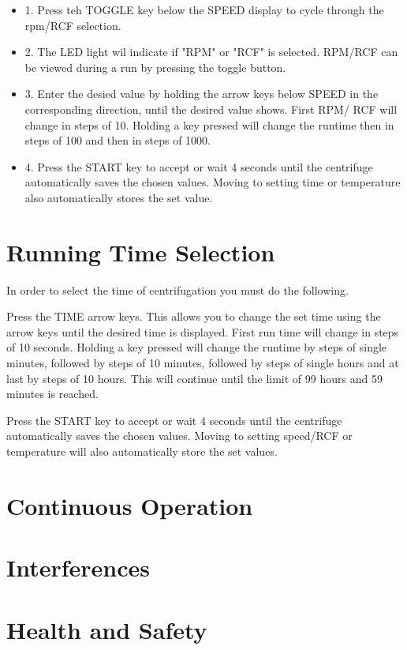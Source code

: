 \documentclass[12pt]{../SOP3_beta}
\begin{document}
\begin{itemize}
  \item 1. Press teh TOGGLE key below the SPEED display to cycle through the rpm/RCF selection.
  \item 2. The LED light wil indicate if "RPM" or "RCF" is selected. RPM/RCF can be viewed during a run by pressing the toggle button. 
  \item 3. Enter the desied value by holding the arrow keys below SPEED in the corresponding direction, until the desired value shows. First RPM/ RCF will change in steps of 10. Holding a key pressed will change the runtime then in steps of 100 and then in steps of 1000. 
  \item 4. Press the START key to accept or wait 4 seconds until the centrifuge automatically saves the chosen values. Moving to setting time or temperature also automatically stores the set value. 
\end{itemize}

\section{Running Time Selection}

\NP In order to select the time of centrifugation you must do the following.

\NP Press the TIME arrow keys. This allows you to change the set time using the arrow keys until the desired time is displayed. First run time will change in steps of 10 seconds. Holding a key pressed will change the runtime by steps of single minutes, followed by steps of 10 minutes, followed by steps of single hours and at last by steps of 10 hours. This will continue until the limit of 99 hours and 59 minutes is reached.

\NP Press the START key to accept or wait 4 seconds until the centrifuge automatically saves the chosen values. Moving to setting speed/RCF or temperature will also automatically store the set values. 

\section{Continuous Operation}

\NP
\section{Interferences}

\section{Health and Safety}
\end{document}

